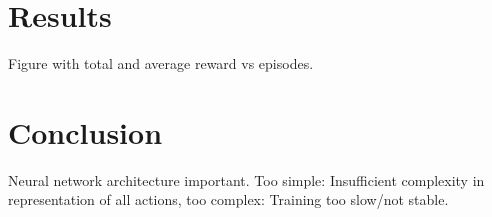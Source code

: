 \documentclass{article}
\begin{document}
\section{Results}
\label{results}
Figure with total and average reward vs episodes.

\section{Conclusion}
\label{conclusion}
Neural network architecture important. Too simple: Insufficient complexity in representation of all actions, too complex: Training too slow/not stable.






\end{document}
